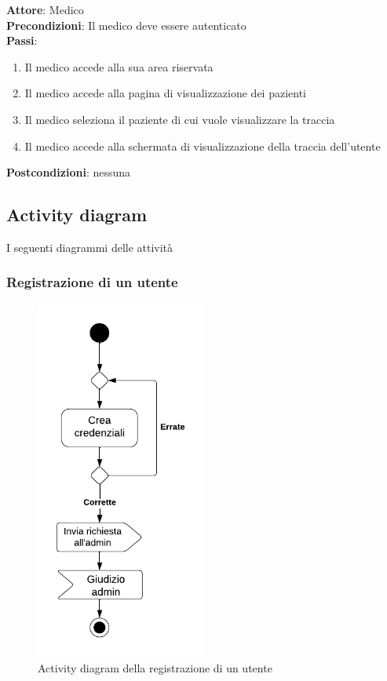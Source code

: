 \documentclass[a4paper]{article}
\begin{document}
\begin{mdframed}
	\textbf{Attore}: Medico\\
	\textbf{Precondizioni}: Il medico deve essere autenticato\\
	\textbf{Passi}: 
	\begin{enumerate}[nosep]
	  \item Il medico accede alla sua area riservata
	  \item Il medico accede alla pagina di visualizzazione dei pazienti
	  \item Il medico seleziona il paziente di cui vuole visualizzare la traccia
	  \item Il medico accede alla schermata di visualizzazione della traccia dell'utente
	\end{enumerate}
	\textbf{Postcondizioni}: nessuna
\end{mdframed}


\subsection{Activity diagram}
I seguenti diagrammi delle attività 

\subsubsection{Registrazione di un utente}
\begin{figure}[H]
  \begin{center}
    \includegraphics[width=0.5\textwidth]{adRegistrazione}
  \end{center}
  \caption{Activity diagram della registrazione di un utente}
  \label{fig:adRegistrazione}
\end{figure}
\end{document}

